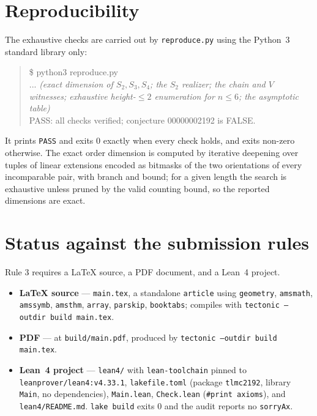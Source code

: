 \documentclass[11pt]{article}
\theoremstyle{definition}
\theoremstyle{remark}
\begin{document}
\section{Reproducibility}

The exhaustive checks are carried out by \texttt{reproduce.py} using the
Python~3 standard library only:

\begin{quote}\ttfamily
\$ python3 reproduce.py\\
... \textit{(exact dimension of $S_2,S_3,S_4$; the $S_2$ realizer; the chain and
$V$ witnesses; exhaustive height-$\le2$ enumeration for $n \le 6$; the
asymptotic table)}\\
PASS: all checks verified; conjecture 00000002192 is FALSE.
\end{quote}

It prints \texttt{PASS} and exits $0$ exactly when every check holds, and exits
non-zero otherwise. The exact order dimension is computed by iterative
deepening over tuples of linear extensions encoded as bitmasks of the two
orientations of every incomparable pair, with branch and bound; for a given
length the search is exhaustive unless pruned by the valid counting bound, so
the reported dimensions are exact.

\section*{Status against the submission rules}

Rule 3 requires a LaTeX source, a PDF document, and a Lean~4 project.

\begin{itemize}
\item \textbf{LaTeX source} --- \texttt{main.tex}, a standalone \texttt{article}
  using \texttt{geometry}, \texttt{amsmath}, \texttt{amssymb}, \texttt{amsthm},
  \texttt{array}, \texttt{parskip}, \texttt{booktabs}; compiles with
  \texttt{tectonic --outdir build main.tex}.
\item \textbf{PDF} --- at \texttt{build/main.pdf}, produced by
  \texttt{tectonic --outdir build main.tex}.
\item \textbf{Lean~4 project} --- \texttt{lean4/} with \texttt{lean-toolchain}
  pinned to \texttt{leanprover/lean4:v4.33.1}, \texttt{lakefile.toml} (package
  \texttt{tlmc2192}, library \texttt{Main}, no dependencies),
  \texttt{Main.lean}, \texttt{Check.lean} (\texttt{\#print axioms}), and
  \texttt{lean4/README.md}. \texttt{lake build} exits $0$ and the audit reports
  no \texttt{sorryAx}.
\end{itemize}
\end{document}
